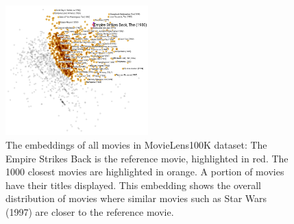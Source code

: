 \documentclass[conference]{IEEEtran}
\begin{document}
\begin{figure}[!ht]\centering
	\includegraphics[width=0.49\textwidth]{movies}
	\caption{
		The embeddings of all movies in MovieLens100K dataset:
		The Empire Strikes Back is the reference movie, highlighted in red.
		The 1000 closest movies are highlighted in orange.
		A portion of movies have their titles displayed.
		This embedding shows the overall distribution of movies where similar movies such as Star Wars (1997) are closer to the reference movie.
	}
	\label{fig:movies}
\end{figure}
\end{document}
